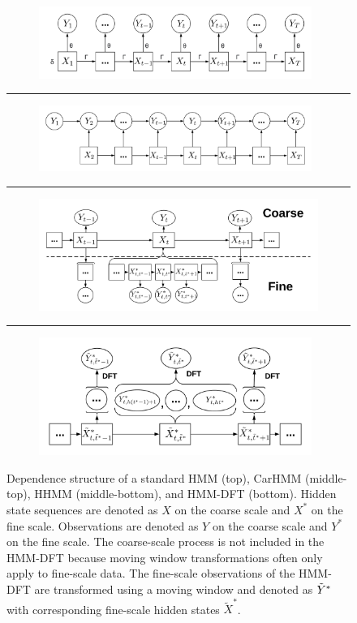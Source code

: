 
\begin{figure}[ht]
    \begin{subfigure}{\textwidth}
      \centering
      \includegraphics[width=3.5in]{../Plots/HMM.png}  
      \label{fig:HMM}
    \end{subfigure}
    \hrule
    \begin{subfigure}{\textwidth}
      \centering
      \includegraphics[width=3.5in]{../Plots/CarHMM.png}  
      \label{fig:CarHMM}
    \end{subfigure}
    \hrule
    \begin{subfigure}{\textwidth}
      \centering
      \includegraphics[width=3.75in]{../Plots/HHMM.png}  
      \label{fig:HHMM}
    \end{subfigure}
    \hrule
    \begin{subfigure}{\textwidth}
      \centering
      \includegraphics[width=3.5in]{../Plots/HMM-DFT.png}  
      \label{fig:HMM-DFT}
    \end{subfigure}
    \caption{Dependence structure of a standard HMM (top), CarHMM (middle-top), HHMM (middle-bottom), and HMM-DFT (bottom). Hidden state sequences are denoted as $X$ on the coarse scale and $X^*$ on the fine scale. Observations are denoted as $Y$ on the coarse scale and $Y^*$ on the fine scale. The coarse-scale process is not included in the HMM-DFT because moving window transformations often only apply to fine-scale data. The fine-scale observations of the HMM-DFT are transformed using a moving window and denoted as $\tilde{Y}^*$ with corresponding fine-scale hidden states $\tilde X^*$.}
    \label{fig:models}
\end{figure}

